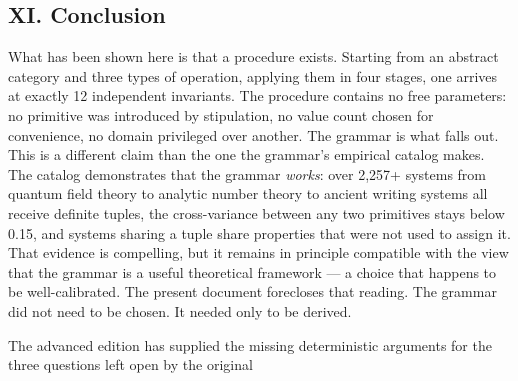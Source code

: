 \documentclass[12pt,a4paper]{article}
\makeatletter
\renewcommand{\_}{\ig@origunderscore\discretionary{}{}{}}
\makeatother
\begin{document}
\subsection{XI. Conclusion}
What has been shown here is that a procedure exists. Starting from an abstract category and three types of operation,
applying them in four stages, one arrives at exactly 12 independent invariants. The procedure contains no free
parameters: no primitive was introduced by stipulation, no value count chosen for convenience, no domain privileged
over another. The grammar is what falls out.
This is a different claim than the one the grammar's empirical catalog makes. The catalog demonstrates that the grammar
\emph{works}: over 2,257+ systems from quantum field theory to analytic number theory to ancient writing systems all
receive definite tuples, the cross-variance between any two primitives stays below 0.15, and systems sharing a tuple
share properties that were not used to assign it. That evidence is compelling, but it remains in principle
compatible with the view that the grammar is a useful theoretical framework --- a choice that happens to be
well-calibrated. The present document forecloses that reading. The grammar did not need to be chosen. It needed only to be derived.

The advanced edition has supplied the missing deterministic arguments for the three questions left open by the original
\end{document}
